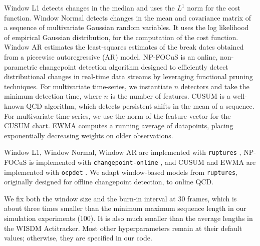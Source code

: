 \documentclass{article}
\theoremstyle{plain}
\theoremstyle{definition}
\theoremstyle{remark}
\begin{document}
Window L1 detects changes in the median and uses the $L^1$ norm for the cost function. 
Window Normal detects changes in the mean and covariance matrix of a sequence of multivariate Gaussian random variables. It uses the log likelihood of empirical Gaussian distribution, for the computation of the cost function.
Window AR estimates the least-squares estimates of the break dates obtained from a piecewise autoregressive (AR) model.
NP‑FOCuS is an online, non-parametric changepoint detection algorithm designed to efficiently detect distributional changes in real-time data streams by leveraging functional pruning techniques. 
For multivariate time-series, we instantiate $n$ detectors and take the minimum detection time, where $n$ is the number of features.
CUSUM is a well-known QCD algorithm, which detects persistent shifts in the mean of a sequence. For multivariate time-series, we use the norm of the feature vector for the CUSUM chart.
EWMA computes a running average of datapoints, placing exponentially decreasing weights on older observations. 

Window L1, Window Normal, Window AR are implemented with \texttt{ruptures} \citep{ruptures}, NP-FOCuS is implemented with \texttt{changepoint-online} \citep{changepoint_online}, and CUSUM and EWMA are implemented with \texttt{ocpdet} \citep{ocpdet}.
We adapt window-based models from \texttt{ruptures}, originally designed for offline changepoint detection, to online QCD.

We fix both the window size and the burn-in interval at $30$ frames, which is about three times smaller than the minimum maximum sequence length in our simulation experiments ($100$). It is also much smaller than the average lengths in the WISDM Actitracker. Most other hyperparameters remain at their default values; otherwise, they are specified in our code.
\end{document}
